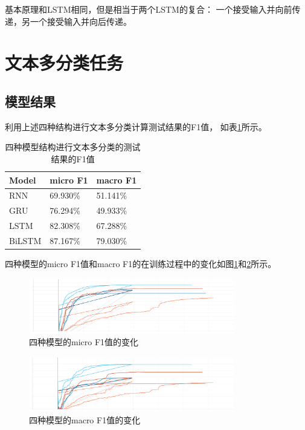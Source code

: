 \documentclass{article}
\begin{document}
基本原理和LSTM相同，但是相当于两个LSTM的复合：
一个接受输入并向前传递，另一个接受输入并向后传递。

\section{文本多分类任务}

\subsection{模型结果}

利用上述四种结构进行文本多分类计算测试结果的F1值，
如表\ref{result-text}所示。

\begin{table}[h]
    \centering
    \begin{tabular}{lll}
        \hline
        \textbf{Model} & \textbf{micro F1} & \textbf{macro F1} \\
        \hline
        \hline
        RNN            & 69.930\%          & 51.141\%          \\
        GRU            & 76.294\%          & 49.933\%          \\
        LSTM           & 82.308\%          & 67.288\%          \\
        BiLSTM         & 87.167\%          & 79.030\%          \\
        \hline
    \end{tabular}
    \label{result-text}
    \caption{四种模型结构进行文本多分类的测试结果的F1值}
\end{table}

四种模型的micro F1值和macro F1的在训练过程中的变化如图\ref{mif1}和\ref{maf1}所示。

\begin{figure}[H]
    \centering
    \includegraphics[width=0.8\textwidth]{figures/MicroF1Score_dev.png}
    \caption{四种模型的micro F1值的变化}
    \label{mif1}
\end{figure}

\begin{figure}[H]
    \centering
    \includegraphics[width=0.8\textwidth]{figures/MacroF1Score_dev.png}
    \caption{四种模型的macro F1值的变化}
    \label{maf1}
\end{figure}
\end{document}
